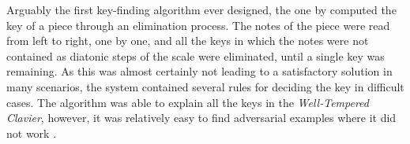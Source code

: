 



Arguably the first key-finding algorithm ever designed, the
one by \textcite{longuethiggins1971interpreting} computed
the key of a piece through an elimination process. The notes
of the piece were read from left to right, one by one, and
all the keys in which the notes were not contained as
diatonic steps of the scale were eliminated, until a single
key was remaining. As this was almost certainly not leading
to a satisfactory solution in many scenarios, the system
contained several rules for deciding the key in difficult
cases. The algorithm was able to explain all the keys in the
\emph{Well-Tempered Clavier}, however, it was relatively
easy to find adversarial examples where it did not work
\parencite{temperley2008pitchclass}.



